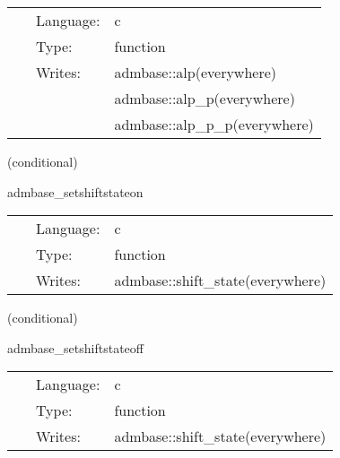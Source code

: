 \hspace{5mm}{\it set the lapse to 1 at all points } 


\hspace{5mm}

 \begin{tabular*}{160mm}{cll} 
~ & Language:  & c \\ 
~ & Type:  & function \\ 
~ & Writes:  & admbase::alp(everywhere) \\ 
~& ~ &admbase::alp\_p(everywhere)\\ 
~& ~ &admbase::alp\_p\_p(everywhere)\\ 
\end{tabular*} 


\vspace{5mm}

   (conditional) 

\hspace{5mm} admbase\_setshiftstateon 

\hspace{5mm}{\it set the shift\_state variable to 1 } 


\hspace{5mm}

 \begin{tabular*}{160mm}{cll} 
~ & Language:  & c \\ 
~ & Type:  & function \\ 
~ & Writes:  & admbase::shift\_state(everywhere) \\ 
\end{tabular*} 


\vspace{5mm}

   (conditional) 

\hspace{5mm} admbase\_setshiftstateoff 

\hspace{5mm}{\it set the shift\_state variable to 0 } 


\hspace{5mm}

 \begin{tabular*}{160mm}{cll} 
~ & Language:  & c \\ 
~ & Type:  & function \\ 
~ & Writes:  & admbase::shift\_state(everywhere) \\ 
\end{tabular*} 


